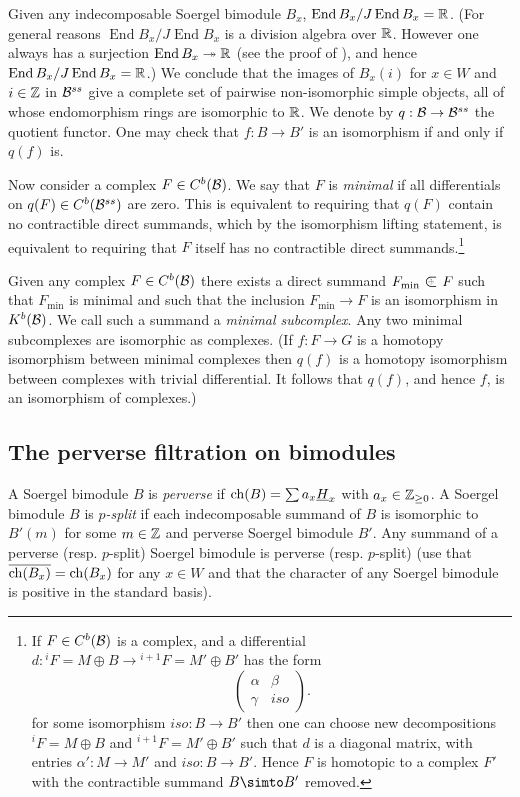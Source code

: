 \documentclass[11pt]{amsart}
\numberwithin{equation}{section}
\def\BS{{\EuScript B}}
\def\a{\alpha}
\def\b{\beta}
\def\g{\gamma}
\def\un{\underline}
\def\to{\rightarrow}
\def\onto{\twoheadrightarrow}
\def\summand{
\mathbin{\tikz [baseline=-3pt]
{
\clip (-0.2,-0.15) rectangle (0.2,0.15);
\node[scale=1.2] at (0,0) {$\subset$}; \node[scale=0.5] at
  (0,0) {$\oplus$}; }}
}
\DeclareMathOperator{\End}{End} %
\theoremstyle{definition}
\theoremstyle{remark}
\begin{document}
{Given any indecomposable Soergel bimodule $B_x$, $\End B_x / J \End
B_x = \RM$. (For general reasons $\End B_x / J \End
B_x$ is a division algebra over ${\mathbb{R}}$. However one always has a
surjection $\End B_x \onto \RM$ (see the proof of \cite[Satz
6.14]{S3}), and hence $\End B_x / J \End
B_x = \RM$.)  We conclude that the images of $B_x(i)$ for $x \in W$ and $i \in {\mathbb{Z}}$
in ${\mathcal{B}}^{ss}$ give a complete set of pairwise
non-isomorphic simple objects, all of whose endomorphism rings are isomorphic to ${\mathbb{R}}$. We denote by $q : \BC \to \BC^{ss}$ the quotient functor. One may check that $f : B \to B'$ is an
isomorphism if and only if $q(f)$ is.

Now consider a complex $F \in C^b({\mathcal{B}})$. We say that $F$ is
\emph{minimal} if all differentials on $q(F) \in C^b({\mathcal{B}}^{ss})$ are
zero. This is equivalent to requiring that 
$q(F)$ contain no contractible direct summands, which by the
isomorphism lifting statement, is equivalent to requiring that $F$
itself has no contractible direct summands.\footnote{If $F \in C^b({\mathcal{B}})$ is a
complex, and a differential $d : {}^iF = M \oplus B \to {}^{i+1}F = M'
\oplus B' $ has the form
\[
\left ( \begin{matrix} \a & \b \\ \g & iso \end{matrix} \right ).
\]
for some isomorphism $iso : B \to B'$ then one can choose new decompositions ${}^iF = M \oplus B$ and ${}^{i+1}F = M' \oplus B'$
such that $d$ is a diagonal matrix, with entries $\a' : M \to M'$ and
$iso : B \to B'$. Hence $F$ is homotopic to a complex $F'$ with the
contractible summand $B \simto B'$ removed.
}

Given any complex $F \in C^b({\mathcal{B}})$ there exists a direct summand $F_{\min}
\summand F$ such that $F_{\min}$ is minimal and such that the
inclusion $F_{\min} \to F$ is an isomorphism in $K^b({\mathcal{B}})$. We call
such a summand a \emph{minimal subcomplex}.
Any two minimal subcomplexes are isomorphic as
complexes. (If $f : F \to G$ is a homotopy isomorphism
between minimal complexes then $q(f)$ is a homotopy isomorphism 
between complexes with trivial differential. It follows that $q(f)$,
and hence $f$, is an isomorphism
 of complexes.)



\subsection{The perverse filtration on bimodules}

A Soergel bimodule $B$ is \emph{perverse} if $\ch(B) = \sum a_x
\un{H}_x$ with $a_x \in {\mathbb{Z}}_{\ge 0}$. A Soergel bimodule $B$ is
\emph{$p$-split} if each indecomposable summand of $B$ is isomorphic
to $B'(m)$ for some $m \in {\mathbb{Z}}$ and perverse Soergel bimodule $B'$. Any summand of
a perverse (resp. $p$-split) Soergel bimodule is perverse
(resp. $p$-split) (use that $\overline{\operatorname{ch}(B_x)} = \operatorname{ch}(B_x)$ for any
$x \in W$ and that the character of any Soergel bimodule is positive
in the standard basis).

}
\end{document}
